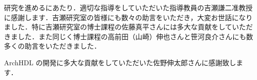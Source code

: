 研究を進めるにあたり．適切な指導をしていただいた指導教員の吉瀬謙二准教授に感謝します．吉瀬研究室の皆様にも数々の助言をいただき，大変お世話になりました．特に吉瀬研究室の博士課程の佐藤真平さんには多大な貢献をしていただきました．また同じく博士課程の高前田（山崎）伸也さんと笹河良介さんにも数多くの助言をいただきました．

ArchHDL の開発に多大な貢献をしていただいた佐野伸太郎さんに感謝致します．